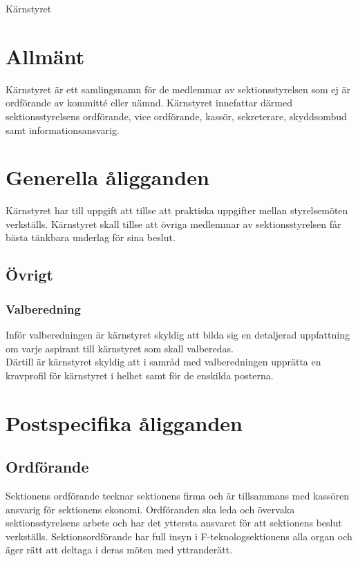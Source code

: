 \documentclass[a4paper]{article}
\begin{document}
\renewcommand{\forening}{Kärnstyret} %

\begin{foreningenv}{\forening{}} %
    \section{Allmänt}
    Kärnstyret är ett samlingsnamn för de medlemmar av sektionsstyrelsen som ej är ordförande av kommitté eller nämnd. Kärnstyret innefattar därmed sektionsstyrelsens ordförande, vice ordförande, kassör, sekreterare, skyddsombud samt informationsansvarig.
    
    \section{Generella åligganden}
    Kärnstyret har till uppgift att tillse att praktiska uppgifter mellan styrelsemöten verkställs. Kärnstyret skall tillse att övriga medlemmar av sektionsstyrelsen får bästa tänkbara underlag för sina beslut.
    
    \subsection{Övrigt}
    \subsubsection{Valberedning}
    Inför valberedningen är kärnstyret skyldig att bilda sig en detaljerad uppfattning om varje aspirant till kärnstyret som skall valberedas.\\
    Därtill är kärnstyret skyldig att i samråd med valberedningen upprätta en kravprofil för kärnstyret i helhet samt för de enskilda posterna.
    
    \section{Postspecifika åligganden}
    \subsection{Ordförande}
    Sektionens ordförande tecknar sektionens firma och är tillsammans med kassören ansvarig för sektionens ekonomi. Ordföranden ska leda och övervaka sektionsstyrelsens arbete och har det yttersta ansvaret för att sektionens beslut verkställs. Sektionsordförande har full insyn i F-teknologsektionens alla organ och äger rätt att deltaga i deras möten med yttranderätt. \\


\end{foreningenv}
\end{document}
